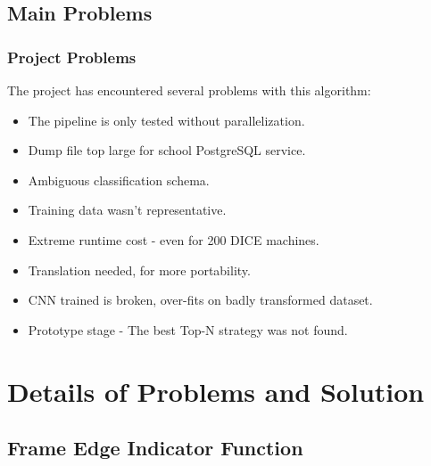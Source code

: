 \documentclass{beamer}[fullspacing]
\begin{document}
\subsection{Main Problems}

\begin{frame}
\frametitle{Project Problems}

The project has encountered several problems with this algorithm:
\begin{itemize}
\item
The pipeline is only tested without parallelization.
\item
Dump file top large for school PostgreSQL service.
\item
Ambiguous classification schema.
\item
Training data wasn't representative.
\item
Extreme runtime cost - even for 200 DICE machines.
\item
Translation needed, for more portability.
\item
CNN trained is broken, over-fits on badly transformed dataset. 
\item
Prototype stage - The best Top-N strategy was not found.
\end{itemize}

\end{frame}


\begin{frame}
\tableofcontents
\end{frame}

\section{Details of Problems and Solution}



\subsection{Frame Edge Indicator Function}
\end{document}
